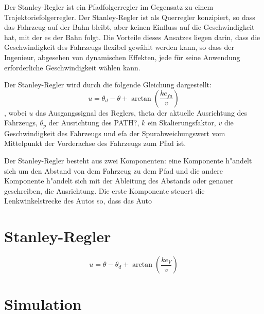 \documentclass[arbeit=studie,oneside,BCOR=12mm]{ArbeitRST}
\begin{document}
Der Stanley-Regler ist ein Pfadfolgerregler im Gegensatz zu einem 
Trajektoriefolgerregler. Der Stanley-Regler ist als Querregler konzipiert, so 
dass das Fahrzeug auf der Bahn bleibt, aber keinen Einfluss auf die 
Geschwindigkeit hat, mit der es der Bahn folgt. Die Vorteile dieses Ansatzes 
liegen darin, dass die Geschwindigkeit des Fahrzeugs flexibel gewählt werden 
kann, so dass der Ingenieur, abgesehen von dynamischen Effekten, jede für 
seine Anwendung erforderliche Geschwindigkeit wählen kann.

Der Stanley-Regler wird durch die folgende Gleichung dargestellt:
$$u = \theta_d - \theta + \arctan\left(\frac{ke_{fa}}{v}\right)$$,
wobei $u$ das Ausgangssignal des Reglers, theta der aktuelle Ausrichtung des 
Fahrzeugs, $\theta_p$ der Ausrichtung des PATH?, $k$ ein Skalierungsfaktor, 
$v$ die Geschwindigkeit des 
Fahrzeugs und efa der Spurabweichungswert vom Mittelpunkt der Vorderachse des 
Fahrzeugs zum Pfad ist.


Der Stanley-Regler besteht aus zwei Komponenten: eine Komponente h"andelt sich 
um den Abstand von dem Fahrzeug zu dem Pfad und die andere Komponente h"andelt
sich mit der Ableitung des Abstands oder genauer geschreiben, die Ausrichtung.
Die erste Komponente steuert die Lenkwinkelstrecke des Autos so, dass das Auto



\section{Stanley-Regler}
\begin{equation}
    u = \theta - \theta_d + \arctan\left(\frac{ke_V}{v}\right)
    \label{eq:Stanley-Regler}
\end{equation}

\section{Simulation}
\end{document}
